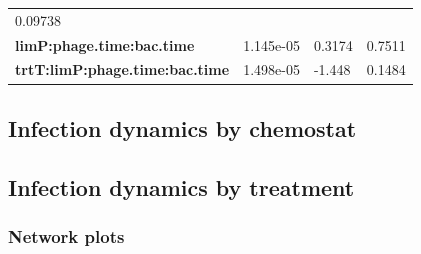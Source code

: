 \documentclass[]{article}
\begin{document}
\begin{longtable}[]{@{}llll@{}}
\begin{minipage}[t]{0.16\columnwidth}
0.09738
\strut\end{minipage}\tabularnewline
\begin{minipage}[t]{0.43\columnwidth}\raggedright\strut
\textbf{limP:phage.time:bac.time}
\strut\end{minipage} &
\begin{minipage}[t]{0.17\columnwidth}\raggedright\strut
1.145e-05
\strut\end{minipage} &
\begin{minipage}[t]{0.13\columnwidth}\raggedright\strut
0.3174
\strut\end{minipage} &
\begin{minipage}[t]{0.16\columnwidth}\raggedright\strut
0.7511
\strut\end{minipage}\tabularnewline
\begin{minipage}[t]{0.43\columnwidth}\raggedright\strut
\textbf{trtT:limP:phage.time:bac.time}
\strut\end{minipage} &
\begin{minipage}[t]{0.17\columnwidth}\raggedright\strut
1.498e-05
\strut\end{minipage} &
\begin{minipage}[t]{0.13\columnwidth}\raggedright\strut
-1.448
\strut\end{minipage} &
\begin{minipage}[t]{0.16\columnwidth}\raggedright\strut
0.1484
\strut\end{minipage}\tabularnewline
\bottomrule
\end{longtable}

\newpage

\subsection{Infection dynamics by
chemostat}\label{infection-dynamics-by-chemostat}

\newpage

\subsection{Infection dynamics by
treatment}\label{infection-dynamics-by-treatment}

\subsubsection{Network plots}\label{network-plots}
\end{document}
